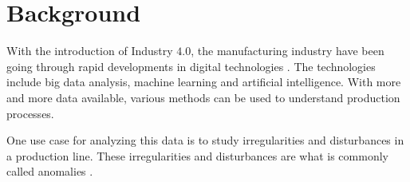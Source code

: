 \section{Background}

With the introduction of Industry $4.0$, the manufacturing industry have been going through rapid developments in digital technologies \cite{industry4}. The technologies include big data analysis, machine learning and artificial intelligence. With more and more data available, various methods can be used to understand production processes. 
\par
One use case for analyzing this data is to study irregularities and disturbances in a production line. These irregularities and disturbances are what is commonly called anomalies \cite{AnomalyDef}.